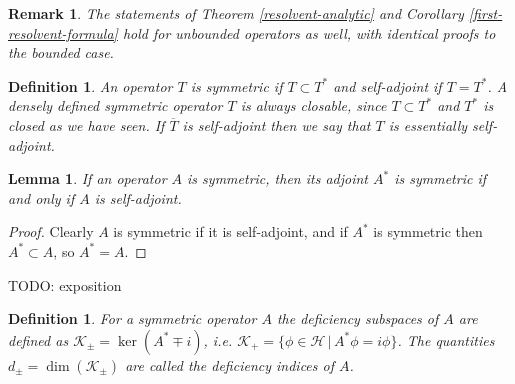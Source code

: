 \documentclass[12pt,oneside]{report}
\newtheorem{lem}[thm]{Lemma}
\newtheorem{defn}[thm]{Definition}
\newtheorem{rem}[thm]{Remark}
\begin{document}
\begin{rem}\label{first-resolvent-remark-unbdd}
    The statements of Theorem \ref{resolvent-analytic} and Corollary \ref{first-resolvent-formula} hold for unbounded operators as well, with identical proofs to the bounded case.
\end{rem}

\begin{defn}
    An operator $T$ is symmetric if $T \subset T^{*}$ and self-adjoint if $T = T^{*}$. A densely defined symmetric operator $T$ is always closable, since $T \subset T^{*}$ and $T^{*}$ is closed as we have seen. If $\overline{T}$ is self-adjoint then we say that $T$ is essentially self-adjoint.
\end{defn}

\begin{lem}
    If an operator $A$ is symmetric, then its adjoint $A^{*}$ is symmetric if and only if $A$ is self-adjoint.
\end{lem}
\begin{proof}
    Clearly $A$ is symmetric if it is self-adjoint, and if $A^{*}$ is symmetric then $A^{*} \subset A$, so $A^{*} = A$.
\end{proof}

TODO: exposition

\begin{defn}
    For a symmetric operator $A$ the deficiency subspaces of $A$ are defined as $\mathscr{K}_{\pm} = \ker(A^{*}\mp i)$, i.e. $\mathscr{K}_{+} = \{ \phi \in \mathscr{H} \, | \, A^{*}\phi = i \phi \}$. The quantities $d_{\pm} = \dim(\mathscr{K}_{\pm})$ are called the deficiency indices of $A$.
\end{defn}
\end{document}
